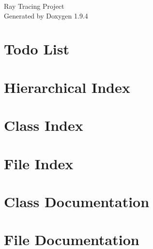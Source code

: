 \documentclass[twoside]{book}
\newcommand{\+}{\discretionary{\mbox{\scriptsize$\hookleftarrow$}}{}{}}
\newcommand{\clearemptydoublepage}{%
    \newpage{\pagestyle{empty}\cleardoublepage}%
  }
\begin{document}
  \raggedbottom
    \hypersetup{pageanchor=false,
                bookmarksnumbered=true,
                pdfencoding=unicode
               }
  \begin{titlepage}
  \vspace*{7cm}
  \begin{center}%
  {\Large Ray Tracing Project}\\
  \vspace*{1cm}
  {\large Generated by Doxygen 1.9.4}\\
  \end{center}
  \end{titlepage}
  \clearemptydoublepage
  \tableofcontents
  \clearemptydoublepage
  \hypersetup{pageanchor=true}
\chapter{Todo List}
\label{todo}

\chapter{Hierarchical Index}

\chapter{Class Index}

\chapter{File Index}

\chapter{Class Documentation}










\chapter{File Documentation}















  \backmatter
  \newpage
  \clearemptydoublepage
  \printindex
\end{document}
